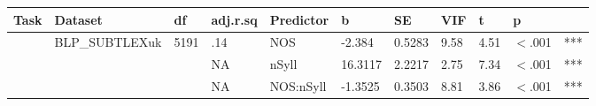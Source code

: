 \begin{table}[ht]
\centering
\begingroup\normalsize
\begin{tabular}{lllllllllll}
  \hline
Task & Dataset & df & adj.r.sq & Predictor & b & SE & VIF & t & p &  \\ 
  \hline
 & BLP\_SUBTLEXuk & 5191 & .14 & NOS & -2.384 & 0.5283 & 9.58 & 4.51 & $<$.001 & *** \\ 
   &  &  & NA & nSyll & 16.3117 & 2.2217 & 2.75 & 7.34 & $<$.001 & *** \\ 
   &  &  & NA & NOS:nSyll & -1.3525 & 0.3503 & 8.81 & 3.86 & $<$.001 & *** \\ 
   \hline
\end{tabular}
\endgroup
\end{table}
